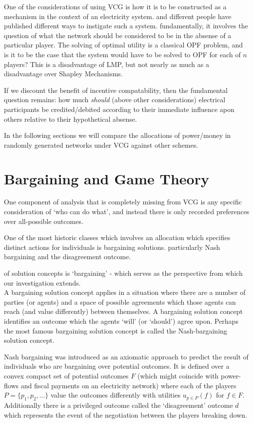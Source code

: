 \documentclass{article}
\begin{document}
One of the considerations of using VCG is how it is to be constructed as a mechanism in the context of an electricity system.
and different people have published different ways to instigate such a system.
fundamentally, it involves the question of what the network should be considered to be in the absense of a particular player.
The solving of optimal utility is a classical OPF problem, and is it to be the case that the system would have to be solved to OPF for each of $n$ players?
This is a disadvantage of LMP, but not nearly as much as a disadvantage over Shapley Mechanisms.

If we discount the benefit of incentive compatability, then the fundamental question remains: how much \textit{should} (above other considerations) electrical participants be credited/debited according to their immediate influence apon others relative to their hypothetical absense.

In the following sections we will compare the allocations of power/money in randomly generated networks under VCG against other schemes.


\section{Bargaining and Game Theory}

One component of analysis that is completely missing from VCG is any specific consideration of `who can do what', and instead there is only recorded preferences over all-possible outcomes.

One of the most historic classes which involves an allocation which specifies distinct actions for individuals is bargaining solutions.
particularly Nash bargaining and the disagreement outcome.

of solution concepts is `bargaining' - which serves as the perspective from which our investigation extends.\\

A bargaining solution concept applies in a situation where there are a number of parties (or agents) and a space of possible agreements which those agents can reach (and value differently) between themselves.
A bargaining solution concept identifies an outcome which the agents `will' (or `should') agree upon.
Perhaps the most famous bargaining solution concept is called the Nash-bargaining solution concept.

Nash bargaining was introduced \cite{nash1} as an axiomatic approach to predict the result of individuals who are bargaining over potential outcomes.
It is defined over a convex compact set of potential outcomes $F$ (which might coincide with power-flows and fiscal payments on an electricity network) 
where each of the players $P=\{p_1,p_2,\dots\}$ value the outcomes differently with utilities $u_{p\in P}(f)$ for $f\in F$.
Additionally there is a privileged outcome called the `disagreement' outcome $d$ which represents the event of the negotiation between the players breaking down.
\end{document}
